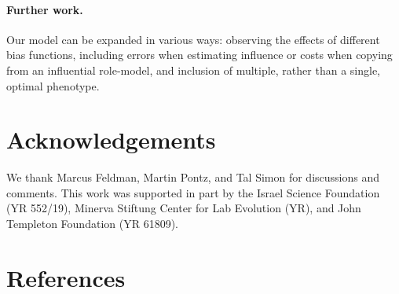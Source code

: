 \documentclass[12pt]{extarticle}
\begin{document}
\paragraph{Further work.} %
Our model can be expanded in various ways: observing the effects of different bias functions, 
including errors when estimating influence or costs when copying from an influential role-model, and inclusion of multiple, rather than a single, optimal phenotype.

{\small
\section*{Acknowledgements}
We thank Marcus Feldman, Martin Pontz, and Tal Simon for discussions and comments.
This work was supported in part by 
the Israel Science Foundation (YR 552/19),
Minerva Stiftung Center for Lab Evolution (YR),
and 
John Templeton Foundation (YR 61809).
}

\section*{References}
\nolinenumbers

%

\end{document}

